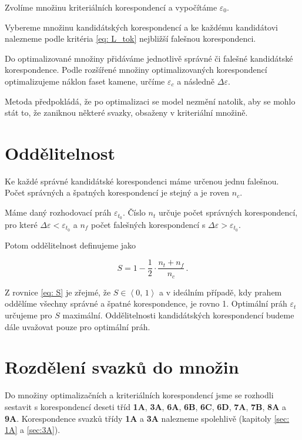 	Zvolíme množinu kriteriálních korespondencí a vypočítáme $\varepsilon_0$. 
	
	Vybereme množinu kandidátských korespondencí a ke každému kandidátovi nalezneme podle kritéria \ref{eq: L_tok} nejbližší falešnou korespondenci. 
	
	Do optimalizované množiny přidáváme jednotlivě správné či falešné kandidátské korespondence. Podle rozšířené množiny optimalizovaných korespondencí optimalizujeme náklon faset kamene, určíme $\varepsilon_c$ a následně $\Delta\varepsilon$.   	
	
	Metoda předpokládá, že po optimalizaci se model nezmění natolik, aby se mohlo stát to, že zaniknou některé svazky, obsaženy v kriteriální množině. 		

\section{Oddělitelnost}
	Ke každé správné kandidátské korespondenci máme určenou jednu falešnou. Počet správných a špatných korespondencí je stejný a je roven $n_c$. 

	Máme daný rozhodovací práh $\varepsilon_{t_0}$.	Číslo $n_t$ určuje počet správných korespondencí, pro které $\Delta\varepsilon  < \varepsilon_{t_0}$ a $n_f$ počet falešných korespondencí s $\Delta\varepsilon  > \varepsilon_{t_0}$. 
	
	Potom oddělitelnost definujeme jako 
	
	\begin{equation}
		S = 1 - \frac{1}{2} \cdot \frac{n_t+n_f}{n_c}\,. 
	\label{eq: S}
	\end{equation}
	
	Z rovnice \ref{eq: S} je zřejmé, že $S \in \left\langle0,\,1 \right\rangle$ a v ideálním případě, kdy prahem oddělíme všechny správné a špatné korespondence, je rovno 1. Optimální práh $\varepsilon_{t}$ určujeme pro $S$ maximální. Oddělitelnosti kandidátských korespondencí budeme dále uvažovat pouze pro optimální práh. 
	
	 
\section{Rozdělení svazků do množin}

Do množiny optimalizačních a kriteriálních korespondencí jsme se rozhodli sestavit s korespondencí deseti tříd \textbf{1A}, \textbf{3A}, \textbf{6A}, \textbf{6B}, \textbf{6C}, \textbf{6D}, \textbf{7A}, \textbf{7B}, \textbf{8A} a \textbf{9A}. Korespondence svazků třídy \textbf{1A} a \textbf{3A} nalezneme spolehlivě (kapitoly \ref{sec: 1A} a \ref{sec:3A}). 

